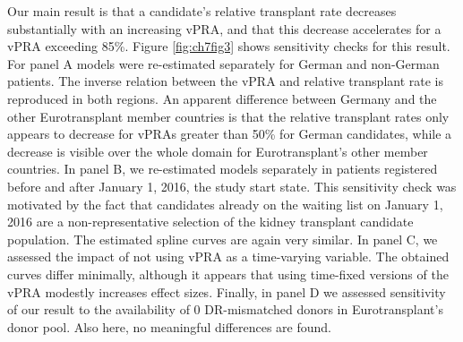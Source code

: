 \documentclass[11pt,twoside,]{book}
\begin{document}
Our main result is that a candidate's relative transplant rate decreases
substantially with an increasing vPRA, and that this decrease accelerates for
a vPRA exceeding 85\%. Figure \ref{fig:ch7fig3} shows sensitivity checks for this result.
For panel A models were re-estimated separately for German and non-German patients.
The inverse relation between the vPRA and relative transplant rate
is reproduced in both regions. An apparent difference between Germany and the
other Eurotransplant member countries is that the relative
transplant rates only appears to decrease for vPRAs greater than 50\% for German candidates,
while a decrease is visible over the whole domain for Eurotransplant's other member countries.
In panel B, we re-estimated models
separately in patients registered before and after January 1, 2016, the study start
state. This sensitivity check was motivated by the fact that
candidates already on the waiting list on January 1, 2016 are a
non-representative selection
of the kidney transplant candidate population. The estimated spline curves
are again very similar. In panel C, we assessed the impact of not using vPRA
as a time-varying variable. The obtained curves differ minimally, although it appears that
using time-fixed versions of the vPRA modestly increases effect
sizes. Finally, in panel D we assessed sensitivity of our result to the
availability of 0 DR-mismatched donors in Eurotransplant's donor pool. Also
here, no meaningful differences are found.
\end{document}
